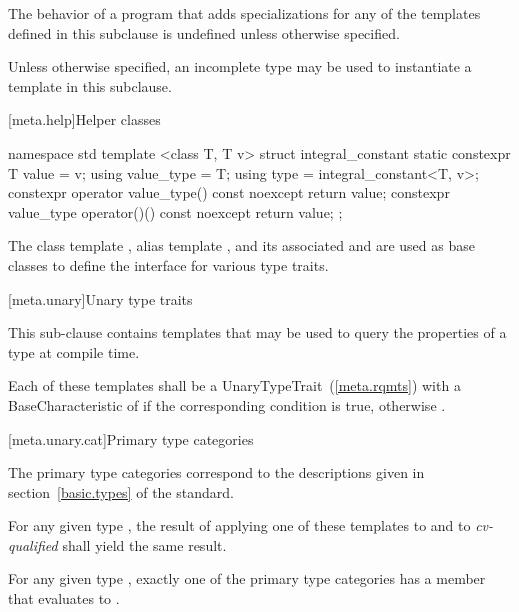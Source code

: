 \pnum
The behavior of a program that adds specializations for any of
the templates defined in this subclause is undefined unless otherwise specified.

\pnum
Unless otherwise specified, an incomplete type may be used
to instantiate a template in this subclause.

[meta.help]{Helper classes}

\begin{codeblock}
namespace std {
  template <class T, T v>
  struct integral_constant {
    static constexpr T value = v;
    using value_type = T;
    using type       = integral_constant<T, v>;
    constexpr operator value_type() const noexcept { return value; }
    constexpr value_type operator()() const noexcept { return value; }
  };
}
\end{codeblock}

%
%
%
%
\pnum
The class template ,
alias template , and
its associated 
 and 
are used as base classes to define
the interface for various type traits.

[meta.unary]{Unary type traits}

\pnum
This sub-clause contains templates that may be used to query the
properties of a type at compile time.

\pnum
Each of these templates shall be a
UnaryTypeTrait~(\ref{meta.rqmts})
with a BaseCharacteristic of
 if the corresponding condition is true, otherwise
.

[meta.unary.cat]{Primary type categories}

\pnum
The primary type categories correspond to the descriptions given in
section~\ref{basic.types} of the \Cpp standard.

\pnum
For any given type , the result of applying one of these templates to
 and to \textit{cv-qualified}  shall yield the same result.

\pnum
\begin{note}
For any given type , exactly one of the primary type categories
has a  member that evaluates to .
\end{note}

